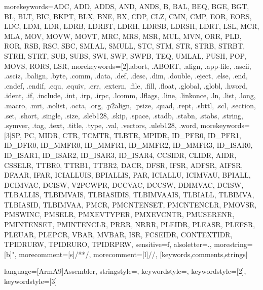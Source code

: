  {
 	morekeywords={ADC, ADD, ADDS, AND, ANDS, B, BAL, BEQ, BGE, BGT, BL, BLT, BIC, BKPT, BLX, BNE, BX, CDP, CLZ, CMN, CMP, EOR,%
 	EORS, LDC, LDM, LDR, LDRB, LDRBT, LDRH, LDRSB, LDRSH, LDRT, LSL, MCR, MLA, MOV, MOVW, MOVT, MRC, MRS, MSR, MUL, MVN, ORR, PLD,%
 	ROR, RSB, RSC, SBC, SMLAL, SMULL, STC, STM, STR, STRB, STRBT, STRH, STRT, SUB, SUBS, SWI, SWP, SWPB, TEQ, UMLAL,
 	PUSH, POP, MOVS, RORS, LSR},%
 	morekeywords=[2]{.abort, .ABORT, .align, .app-file, .ascii, .asciz, .balign, .byte, .comm, .data, .def,%
 	.desc, .dim, .double, .eject, .else, .end, .endef, .endif, .equ, .equiv, .err, .extern, .file, .fill, .float,%
 	.global, .globl, .hword, .ident, .if, .include, .int, .irp, .irpc, .lcomm, .lflags, .line, .linkonce, .ln,%
 	.list, .long, .macro, .mri, .nolist, .octa, .org, .p2align, .psize, .quad, .rept, .sbttl, .scl, .section,%
 	.set, .short, .single, .size, .sleb128, .skip, .space, .stadb, .stabn, .stabs, .string, .symver, .tag,%
 	.text, .title, .type, .val, .vectors, .uleb128, .word},%
 	morekeywords=[3]{SP, PC, MIDR, CTR, TCMTR, TLBTR, MPIDR, ID_PFR0, ID_PFR1, ID_DFR0, ID_MMFR0, ID_MMFR1, ID_MMFR2,%
 	ID_MMFR3, ID_ISAR0, ID_ISAR1, ID_ISAR2, ID_ISAR3, ID_ISAR4, CCSIDR, CLIDR, AIDR, CSSELR, TTBR0, TTRB1, TTBR2, DACR,%
 	DFSR, IFSR, ADFSR, AIFSR, DFAAR, IFAR, ICIALLUIS, BPIALLIS, PAR, ICIALLU, ICIMVAU, BPIALL, DCIMVAC, DCISW, V2PCWPR,%
 	DCCVAC, DCCSW, DDIMVAC, DCISW, TLBALLIS, TLBIMVAIS, TLBIASIDIS, TLBIMVAAIS, TLBIALL, TLBIMVA, TLBIASID, TLBIMVAA,%
 	PMCR, PMCNTENSET, PMCNTENCLR, PMOVSR, PMSWINC, PMSELR, PMXEVTYPER, PMXEVCNTR, PMUSERENR, PMINTENSET, PMINTENCLR,%
 	PRRR, NRRR, PLEIDR, PLEASR, PLEFSR, PLEUAR, PLEPCR, VBAR, MVBAR, ISR, FCSEIDR, CONTEXTIDR, TPIDRURW, TPIDRURO, TPIDRPRW},%
 	sensitive=f,%
 	alsoletter=.,%
	morestring=[b]",%
 	morecomment=[s]{/*}{*/},%
 	morecomment=[l]{//},%
   }[keywords,comments,strings]
   
   
   
    {
   language=[ArmA9]{Assembler},
   stringstyle=\color{armStringColour},
   keywordstyle=\color{armInstructionColour},
   keywordstyle=[2]\color{armDirectiveColour},
   keywordstyle=[3]\itshape\color{armSpecialRegColour}
   }

